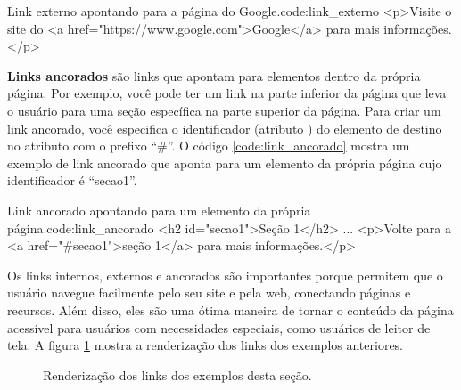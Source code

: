 \begin{htmlcode}{Link externo apontando para a página do Google.}{code:link_externo}
<p>Visite o site do <a href="https://www.google.com">Google</a>
para mais informações.</p>
\end{htmlcode}

\textbf{Links ancorados} são links que apontam para elementos dentro da própria página. Por exemplo, você pode ter um link na parte inferior da página que leva o usuário para uma seção específica na parte superior da página. Para criar um link ancorado, você especifica o identificador (atributo ) do elemento de destino no atributo  com o prefixo ``\#''. O código \ref{code:link_ancorado} mostra um exemplo de link ancorado que aponta para um elemento da própria página cujo identificador é ``secao1''.

\begin{htmlcode}{Link ancorado apontando para um elemento da própria página.}{code:link_ancorado}
<h2 id="secao1">Seção 1</h2>
...
<p>Volte para a <a href="#secao1">seção 1</a> para mais informações.</p>
\end{htmlcode}

Os links internos, externos e ancorados são importantes porque permitem que o usuário navegue facilmente pelo seu site e pela web, conectando páginas e recursos. Além disso, eles são uma ótima maneira de tornar o conteúdo da página acessível para usuários com necessidades especiais, como usuários de leitor de tela. A figura \ref{fig:links} mostra a renderização dos links dos exemplos anteriores.

\begin{figure}[ht!]    
    \caption{Renderização dos links dos exemplos desta seção.}
    \label{fig:links}
\end{figure}


